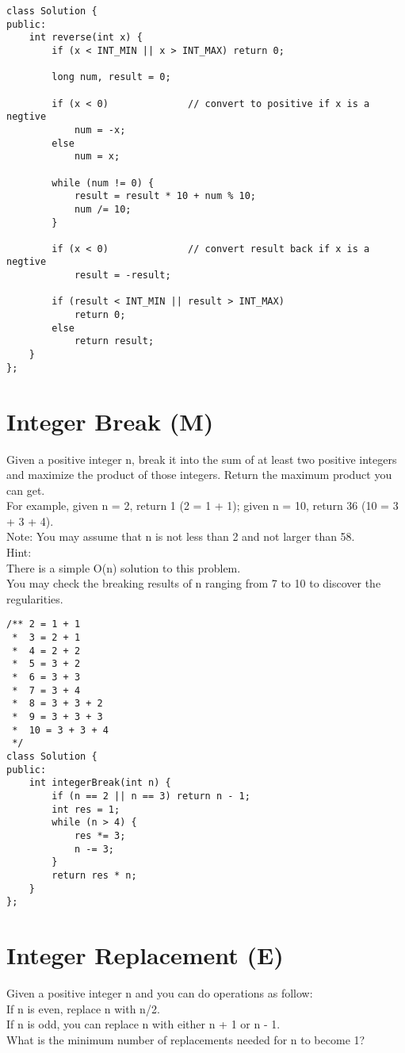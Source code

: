 \begin{lstlisting}
class Solution {
public:
    int reverse(int x) {
        if (x < INT_MIN || x > INT_MAX) return 0;
       
        long num, result = 0;
      
        if (x < 0)              // convert to positive if x is a negtive
            num = -x;
        else
            num = x;
      
        while (num != 0) {
            result = result * 10 + num % 10;
            num /= 10;
        }
        
        if (x < 0)              // convert result back if x is a negtive
            result = -result;

        if (result < INT_MIN || result > INT_MAX)
            return 0;
        else
            return result;
    }
};
\end{lstlisting}


\section{Integer Break (M)}
Given a positive integer n, break it into the sum of at least two positive integers and maximize the product of those integers. Return the maximum product you can get.\\

For example, given n = 2, return 1 (2 = 1 + 1); given n = 10, return 36 (10 = 3 + 3 + 4).\\

Note: You may assume that n is not less than 2 and not larger than 58.\\

Hint:\\
    There is a simple O(n) solution to this problem.\\
    You may check the breaking results of n ranging from 7 to 10 to discover the regularities.\\

\begin{lstlisting}
/** 2 = 1 + 1
 *  3 = 2 + 1
 *  4 = 2 + 2
 *  5 = 3 + 2
 *  6 = 3 + 3
 *  7 = 3 + 4
 *  8 = 3 + 3 + 2
 *  9 = 3 + 3 + 3
 *  10 = 3 + 3 + 4
 */
class Solution {
public:
    int integerBreak(int n) {
        if (n == 2 || n == 3) return n - 1;
        int res = 1;
        while (n > 4) {
            res *= 3;
            n -= 3;
        }
        return res * n;
    }
};
\end{lstlisting}


\section{Integer Replacement (E)}
Given a positive integer n and you can do operations as follow:\\
    If n is even, replace n with n/2.\\
    If n is odd, you can replace n with either n + 1 or n - 1.\\
What is the minimum number of replacements needed for n to become 1?\\

